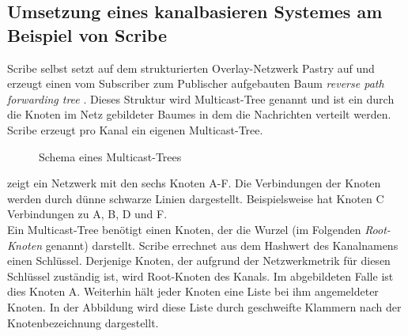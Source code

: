 \subsection[Umsetzung eines kanalbasieren Systemes]{Umsetzung eines kanalbasieren Systemes am Beispiel von Scribe}
\label{chap:related:scribe}
Scribe selbst setzt auf dem strukturierten Overlay-Netzwerk Pastry \cite{Rowstron2001} auf und erzeugt einen vom Subscriber zum Publischer aufgebauten Baum \emph{reverse path forwarding tree} \cite{Dalal1978}. Dieses Struktur wird Multicast-Tree genannt und ist ein durch die Knoten im Netz gebildeter Baumes in dem die Nachrichten verteilt werden. Scribe erzeugt pro Kanal ein eigenen Multicast-Tree.


\begin{figure}[htbp]
\centering
{}
\caption{Schema eines Multicast-Trees}
\label{fig:multicast_tree}
\end{figure}

 zeigt ein Netzwerk mit den sechs Knoten A-F. Die Verbindungen der Knoten werden durch dünne schwarze Linien dargestellt. Beispielsweise hat Knoten C Verbindungen zu A, B, D und F.\\
Ein Multicast-Tree benötigt einen Knoten, der die Wurzel (im Folgenden \emph{Root-Knoten} genannt) darstellt. Scribe errechnet aus dem Hashwert des Kanalnamens einen Schlüssel. Derjenige Knoten, der aufgrund der Netzwerkmetrik für diesen Schlüssel zuständig ist, wird Root-Knoten des Kanals. Im abgebildeten Falle ist dies Knoten A. Weiterhin hält jeder Knoten eine Liste bei ihm angemeldeter Knoten. In der Abbildung wird diese Liste durch geschweifte Klammern nach der Knotenbezeichnung dargestellt.

